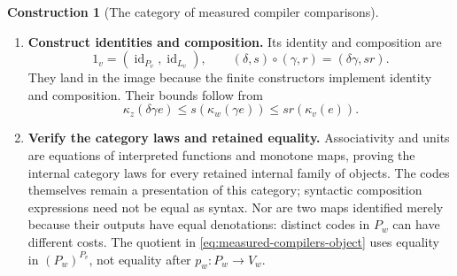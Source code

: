 \documentclass[11pt,a4paper]{article}
\numberwithin{algorithm}{section}
\numberwithin{equation}{section}
\theoremstyle{definition}
\theoremstyle{remark}
\theoremstyle{plain}
\newcommand{\id}{\operatorname{id}}
\theoremstyle{definition}
\newtheorem{construction}[construction]{Construction}
\theoremstyle{plain}
\begin{document}
\begin{construction}[The category of measured compiler comparisons]
\begin{enumerate}[leftmargin=*,align=left]
\item \textbf{Construct identities and composition.}
Its
identity and composition are
\[
 1_v=(\id_{P_v},\id_{L_v}),\qquad
 (\delta,s)\circ(\gamma,r)=(\delta\gamma,sr).
\]
They land in the image because the finite constructors implement identity
and composition. Their bounds follow from
\[
 \kappa_z(\delta\gamma e)\le s(\kappa_w(\gamma e))
                          \le sr(\kappa_v(e)).
\]
\item \textbf{Verify the category laws and retained equality.}
Associativity and units are equations of interpreted functions and
monotone maps, proving the internal category laws for every retained
internal family of objects. The codes themselves remain a presentation
of this category; syntactic composition expressions need not be equal as syntax.
Nor are two maps identified merely because their outputs have equal
denotations: distinct codes in $P_w$ can have different costs. The
quotient in \eqref{eq:measured-compilers-object} uses equality in
$(P_w)^{P_v}$, not equality after $p_w:P_w\to V_w$.
\end{enumerate}
\end{construction}
\end{document}
